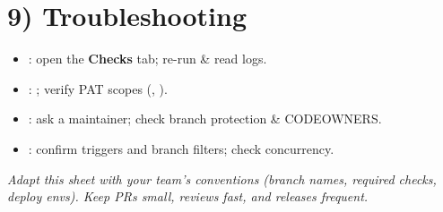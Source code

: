 \documentclass[11pt]{article}
\begin{document}
\section*{9) Troubleshooting}

\begin{itemize}
  \item {}: open the \textbf{Checks} tab; re-run \& read logs.
  \item {}: ; verify PAT scopes (, ).
  \item {}: ask a maintainer; check branch protection \& CODEOWNERS.
  \item {}: confirm  triggers and branch filters; check concurrency.
\end{itemize}

\bigskip
\noindent\textit{Adapt this sheet with your team's conventions (branch names, required checks, deploy envs). Keep PRs small, reviews fast, and releases frequent.}
\end{document}
